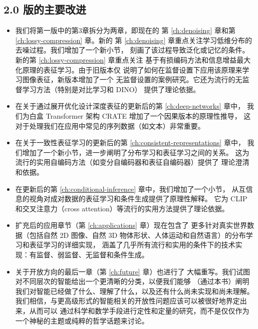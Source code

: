 \documentclass[../../book-main.tex]{subfiles}
\begin{document}
\subsection*{2.0 版的主要改进}
\begin{itemize}
    \item 我们将第一版中的第3章拆分为两章，即现在的
        第 \ref{ch:denoising} 章和第 \ref{ch:lossy-compression} 章。新的
        第 \ref{ch:denoising} 章重点关注学习低维分布的去噪过程。我们增加了一个新小节，
        刻画了该过程导致泛化或记忆的条件。新的第 \ref{ch:lossy-compression} 章重点关注
        基于有损编码方法和信息增益最大化原理的表征学习。由于旧版本仅
        说明了如何在监督设置下应用该原理来学习图像表征，新版本增加了一个
        无监督设置的案例研究。它还为流行的无监督学习方法（特别是对比学习和 DINO）
        提供了理论依据。
    \item 在关于通过展开优化设计深度表征的更新后的第 \ref{ch:deep-networks} 章中，
    我们为白盒 Transformer 架构 CRATE 增加了一个因果版本的原理性推导，
    这对于处理我们在应用中常见的序列数据（如文本）非常重要。
    \item 在关于一致性表征学习的更新后的第 \ref{ch:consistent-representations} 章中，
        我们增加了一个新小节，进一步阐明了分布学习和表征学习之间的关系。
        这为流行的实用自编码方法（如变分自编码器和表征自编码器）提供了
        理论澄清和依据。
    \item 在更新后的第 \ref{ch:conditional-inference} 章中，我们增加了一个小节，
        从互信息的视角对成对数据的表征学习和条件生成提供了原理性解释。
        它为 CLIP 和交叉注意力（cross attention）等流行的实用方法提供了理论依据。
    \item 扩充后的应用章节（第 \ref{ch:applications} 章）现在包含了
        更多针对真实世界数据（包括自然 2D 图像、自然 3D 物体形状、人体运动和自然语言）的分布学习和表征学习的详细实现，
        涵盖了几乎所有流行和实用的条件下的技术实现：有监督、弱监督、无监督和条件生成。 
    \item 关于开放方向的最后一章（第 \ref{ch:future} 章）也进行了
        大幅重写。我们试图对不同层次的智能给出一个更清晰的分类，以便我们能够
        （通过本书）阐明我们对智能已经做了什么、理解了什么，以及还有什么尚未实现和尚未理解。
        我们相信，与更高级形式的智能相关的开放性问题应该可以被很好地界定出来，从而可以
        通过科学和数学手段进行定性和定量的研究，而不是仅仅作为一个神秘的主题或纯粹的哲学话题来讨论。
\end{itemize}
\end{document}
